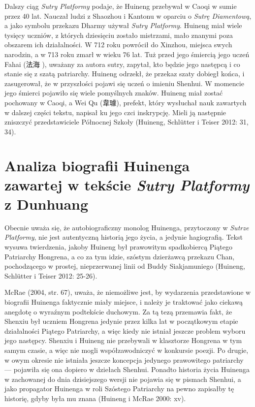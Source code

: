 Dalszy ciąg \textit{Sutry Platformy} podaje, że Huineng przebywał w Caoqi w sumie przez 40 lat.
Nauczał ludzi z Shaozhou i Kantonu w oparciu o \textit{Sutrę Diamentową}, a jako symbolu przekazu Dharmy używał \textit{Sutry Platformy}. Huineng miał wiele tysięcy uczniów, z których dziesięciu zostało mistrzami, mało znanymi poza obszarem ich działalności.
W 712 roku powrócił do Xinzhou, miejsca swych narodzin, a w 713 roku zmarł w wieku 76 lat.
Tuż przed jego śmiercią jego uczeń Fahai (法海 ), uważany za autora sutry, zapytał, kto będzie jego następcą i co stanie się z szatą patriarchy.
Huineng odrzekł, że przekaz szaty dobiegł końca, i zasugerował, że w przyszłości pojawi się uczeń o imieniu Shenhui. W momencie jego śmierci pojawiło się wiele pomyślnych znaków. Huineng miał zostać pochowany w Caoqi, a Wei Qu (韋璩), prefekt, który wysłuchał nauk zawartych w dalszej części tekstu, napisał ku jego czci inskrypcję. Mieli ją następnie zniszczyć przedstawiciele Północnej Szkoły
(Huineng, Schlütter i Teiser 2012: 31, 34).


\section{Analiza biografii Huinenga zawartej w tekście \textit{Sutry Platformy} z Dunhuang}
Obecnie uważa się, że autobiograficzny monolog Huinenga, przytoczony w \textit{Sutrze Platformy}, nie jest autentyczną historią jego życia, a jedynie hagiografią.
Tekst wysuwa twierdzenia, jakoby Huineng był prawowitym spadkobiercą Piątego Patriarchy Hongrena, a co za tym idzie, szóstym dzierżawcą przekazu Chan, pochodzącego w prostej, nieprzerwanej linii od Buddy Siakjamuniego
(Huineng, Schlütter i Teiser 2012: 25-26). %

McRae (2004, str. 67), uważa, że niemożliwe jest, by wydarzenia przedstawione w biografii Huinenga faktycznie miały miejsce, i należy je traktować jako ciekawą anegdotę o wyraźnym podtekście duchowym.
Za tą tezą przemawia fakt, że Shenxiu był uczniem Hongrena jedynie przez kilka lat w początkowym etapie działalności Piątego Patriarchy, a więc kiedy nie istniał jeszcze problem wyboru jego następcy. Shenxiu i Huineng nie przebywali w klasztorze Hongrena w tym samym czasie, a więc nie mogli współzawodniczyć w konkursie poezji.
Po drugie, w owym okresie nie istniała jeszcze koncepcja jedynego prawowitego patriarchy --- pojawiła się ona dopiero w dziełach Shenhui. Ponadto historia życia Huinenga w zachowanej do dnia dzisiejszego wersji nie pojawia się w pismach Shenhui, a jako propagator Huinenga w roli Szóstego Patriarchy na pewno zapisałby tę historię, gdyby była mu znana
(Huineng i McRae 2000: xv).

